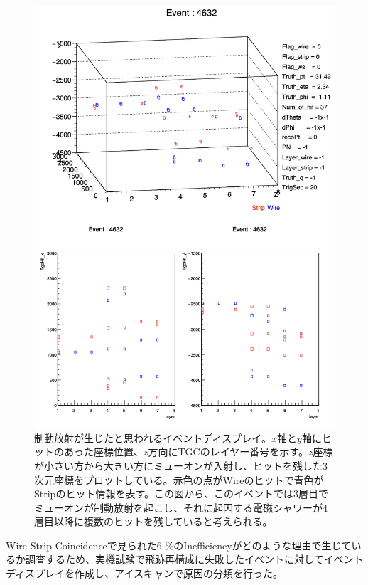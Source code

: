 \begin{figure} 
\centering
\includegraphics[width=16cm]{fig/Test/Brems.png}
\caption[制動放射が生じたと思われるイベントディスプレイ]{制動放射が生じたと思われるイベントディスプレイ。$x$軸と$y$軸にヒットのあった座標位置、$z$方向にTGCのレイヤー番号を示す。$z$座標が小さい方から大きい方にミューオンが入射し、ヒットを残した3次元座標をプロットしている。赤色の点がWireのヒットで青色がStripのヒット情報を表す。この図から、このイベントでは3層目でミューオンが制動放射を起こし、それに起因する電磁シャワーが4層目以降に複数のヒットを残していると考えられる。}
\label{Brems}
\end{figure}

Wire Strip Coincidenceで見られた6 \%のInefficiencyがどのような理由で生じているか調査するため、実機試験で飛跡再構成に失敗したイベントに対してイベントディスプレイを作成し、アイスキャンで原因の分類を行った。

